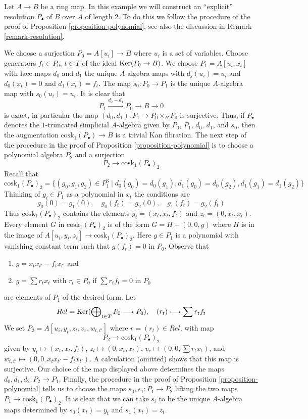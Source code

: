 \begin{example}
\label{example-resolution-length-two}
Let $A \to B$ be a ring map. In this example we 
will construct an ``explicit'' resolution $P_\bullet$ of $B$ over $A$ of
length $2$. To do this we follow the procedure of the proof of
Proposition \ref{proposition-polynomial}, see also the discussion in
Remark \ref{remark-resolution}.

\medskip\noindent
We choose a surjection $P_0 = A[u_i] \to B$ where $u_i$ is a set of
variables. Choose generators $f_t \in P_0$, $t \in T$ of the ideal
$\mathop{\mathrm{Ker}}(P_0 \to B)$. We choose $P_1 = A[u_i, x_t]$ with face maps
$d_0$ and $d_1$ the unique $A$-algebra maps with $d_j(u_i) = u_i$
and $d_0(x_t) = 0$ and $d_1(x_t) = f_t$. The map $s_0 : P_0 \to P_1$
is the unique $A$-algebra map with $s_0(u_i) = u_i$. It is clear that
$$
P_1 \xrightarrow{d_0 - d_1} P_0 \to B \to 0
$$
is exact, in particular the map $(d_0, d_1) : P_1 \to P_0 \times_B P_0$
is surjective. Thus, if $P_\bullet$ denotes the $1$-truncated
simplicial $A$-algebra given by $P_0$, $P_1$, $d_0$, $d_1$, and $s_0$, then
the augmentation $\text{cosk}_1(P_\bullet) \to B$ is a trivial Kan fibration.
The next step of the procedure in the proof of
Proposition \ref{proposition-polynomial}
is to choose a polynomial algebra $P_2$ and a surjection
$$
P_2 \longrightarrow \text{cosk}_1(P_\bullet)_2
$$
Recall that
$$
\text{cosk}_1(P_\bullet)_2 =
\{(g_0, g_1, g_2) \in P_1^3 \mid d_0(g_0) = d_0(g_1),
d_1(g_0) = d_0(g_2), d_1(g_1) = d_1(g_2)\}
$$
Thinking of $g_i \in P_1$ as a polynomial in $x_t$ the conditions
are
$$
g_0(0) = g_1(0),\quad
g_0(f_t) = g_2(0),\quad
g_1(f_t) = g_2(f_t)
$$
Thus $\text{cosk}_1(P_\bullet)_2$ contains the elements
$y_t = (x_t, x_t, f_t)$ and $z_t = (0, x_t, x_t)$.
Every element $G$ in $\text{cosk}_1(P_\bullet)_2$ is
of the form $G = H + (0, 0, g)$ where $H$ is in the image
of $A[u_i, y_t, z_t] \to \text{cosk}_1(P_\bullet)_2$. Here
$g \in P_1$ is a polynomial with vanishing
constant term such that $g(f_t) = 0$ in $P_0$. Observe that
\begin{enumerate}
\item $g = x_t x_{t'} - f_t x_{t'}$ and
\item $g = \sum r_t x_t$ with $r_t \in P_0$ if $\sum r_t f_t = 0$ in $P_0$
\end{enumerate}
are elements of $P_1$ of the desired form. Let
$$
Rel = \mathop{\mathrm{Ker}}(\bigoplus\nolimits_{t \in T} P_0 \longrightarrow P_0),\quad
(r_t) \longmapsto \sum r_tf_t
$$
We set $P_2 = A[u_i, y_t, z_t, v_r, w_{t, t'}]$ where
$r = (r_t) \in Rel$, with map
$$
P_2 \longrightarrow \text{cosk}_1(P_\bullet)_2
$$
given by $y_t  \mapsto (x_t, x_t, f_t)$,
$z_t \mapsto (0, x_t, x_t)$,
$v_r \mapsto (0, 0, \sum r_t x_t)$, and
$w_{t, t'} \mapsto (0, 0, x_t x_{t'} - f_t x_{t'})$. A calculation
(omitted) shows that this map is surjective. Our choice of the
map displayed above determines the maps $d_0, d_1, d_2 : P_2 \to P_1$.
Finally, the procedure in the proof of
Proposition \ref{proposition-polynomial}
tells us to choose the maps $s_0, s_1 : P_1 \to P_2$ lifting the two
maps $P_1 \to \text{cosk}_1(P_\bullet)_2$. It is clear that we can take
$s_i$ to be the unique $A$-algebra maps determined by
$s_0(x_t) = y_t$ and $s_1(x_t) = z_t$.
\end{example}
